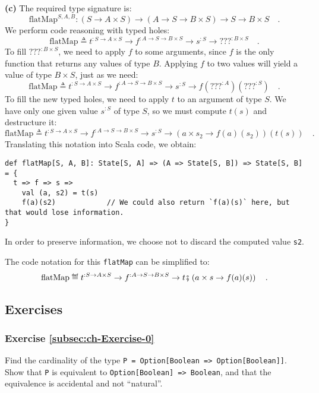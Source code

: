 \textbf{(c)} The required type signature is:
\[
\text{flatMap}^{S,A,B}:(S\rightarrow A\times S)\rightarrow(A\rightarrow S\rightarrow B\times S)\rightarrow S\rightarrow B\times S\quad.
\]
We perform code reasoning with typed holes:
\[
\text{flatMap}\triangleq t^{:S\rightarrow A\times S}\rightarrow f^{:A\rightarrow S\rightarrow B\times S}\rightarrow s^{:S}\rightarrow\text{???}^{:B\times S}\quad.
\]
To fill $\text{???}^{:B\times S}$, we need to apply $f$ to some
arguments, since $f$ is the only function that returns any values
of type $B$. Applying $f$ to two values will yield a value of type
$B\times S$, just as we need:
\[
\text{flatMap}\triangleq t^{:S\rightarrow A\times S}\rightarrow f^{:A\rightarrow S\rightarrow B\times S}\rightarrow s^{:S}\rightarrow f(\text{???}^{:A})(\text{???}^{:S})\quad.
\]
To fill the new typed holes, we need to apply $t$ to an argument
of type $S$. We have only one given value $s^{:S}$ of type $S$,
so we must compute $t(s)$ and destructure it:
\[
\text{flatMap}\triangleq t^{:S\rightarrow A\times S}\rightarrow f^{:A\rightarrow S\rightarrow B\times S}\rightarrow s^{:S}\rightarrow\left(a\times s_{2}\rightarrow f(a)(s_{2})\right)(t(s))\quad.
\]
Translating this notation into Scala code, we obtain:
\begin{lstlisting}
def flatMap[S, A, B]: State[S, A] => (A => State[S, B]) => State[S, B] = {
  t => f => s =>
    val (a, s2) = t(s)
    f(a)(s2)            // We could also return `f(a)(s)` here, but that would lose information.
}
\end{lstlisting}
In order to preserve information, we choose not to discard the computed
value \lstinline!s2!.

The code notation for this \lstinline!flatMap! can be simplified
to:
\[
\text{flatMap}\triangleq t^{:S\rightarrow A\times S}\rightarrow f^{:A\rightarrow S\rightarrow B\times S}\rightarrow t\bef\left(a\times s\rightarrow f(a)(s)\right)\quad.
\]


\subsection{Exercises}

\subsubsection{Exercise \label{subsec:ch-Exercise-0}\ref{subsec:ch-Exercise-0}}

Find the cardinality of the type \lstinline!P = Option[Boolean => Option[Boolean]]!.
Show that \lstinline!P! is equivalent to \lstinline!Option[Boolean] => Boolean!,
and that the equivalence is accidental
and not \textsf{``}natural\textsf{''}.

